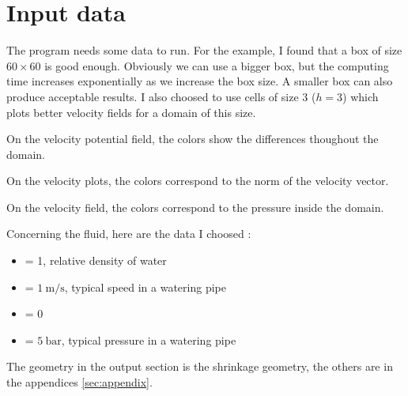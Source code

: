 \section{Input data}
The program needs some data to run. For the example, I found that a box of size
$\num{60} \times \num{60}$ is good enough. Obviously we can use a bigger box,
but the computing time increases exponentially as we increase the box size.
A smaller box can also produce acceptable results. I also choosed to use cells
of size 3 ($h = 3$) which plots better velocity fields for a domain of this
size.

On the velocity potential field, the colors show the differences thoughout the
domain.

On the velocity plots, the colors correspond to the norm of the velocity
vector.

On the velocity field, the colors correspond to the pressure inside the domain.

Concerning the fluid, here are the data I choosed :
\begin{itemize}
      \item {} = 1, relative density of water
      \item {} = $\SI{1}{\meter\per\second}$, typical speed in a watering
            pipe
      \item {} = 0
      \item {} = $\SI{5}{\bar}$, typical pressure in a watering
            pipe
\end{itemize}

The geometry in the output section is the shrinkage geometry, the others are
in the appendices \autoref{sec:appendix}.
